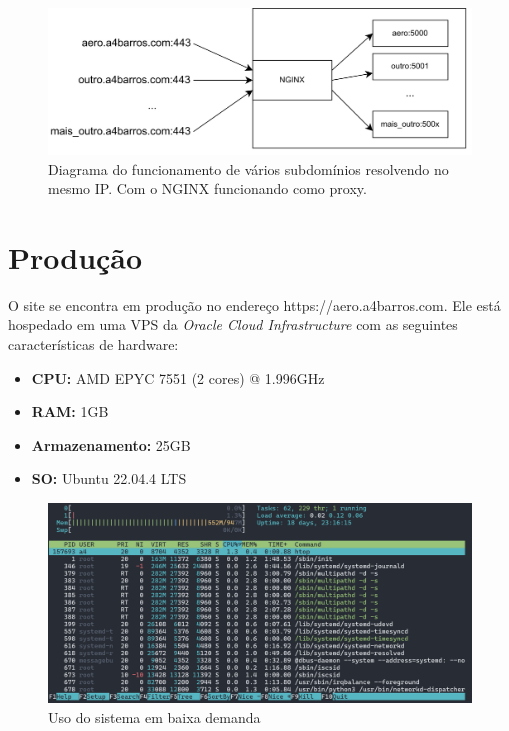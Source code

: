 \begin{figure}[ht]
    \begin{center}
    \includegraphics[width=400pt]{img/arquit.png}
    \caption{Diagrama do funcionamento de vários subdomínios resolvendo no mesmo IP. Com o NGINX funcionando como proxy.}
    \label{fig:sbrf-plot}
    \end{center}
\end{figure}

\section{Produção}
O site se encontra em produção no endereço https://aero.a4barros.com. Ele está hospedado em uma VPS
da \textit{Oracle Cloud Infrastructure} com as seguintes características de hardware:

\begin{itemize}
    \item \textbf{CPU:} AMD EPYC 7551 (2 cores) @ 1.996GHz
    \item \textbf{RAM:} 1GB
    \item \textbf{Armazenamento:} 25GB
    \item \textbf{SO:} Ubuntu 22.04.4 LTS
\end{itemize}

\begin{figure}[ht]
    \begin{center}
    \includegraphics[width=400pt]{img/prod-idle.png}
    \caption{Uso do sistema em baixa demanda}
    \label{fig:prod-idle}
    \end{center}
\end{figure}

